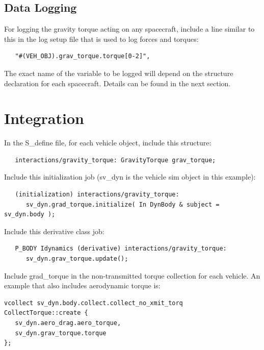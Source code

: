 \subsection{Data Logging}
For logging the gravity torque acting on any spacecraft, include a line similar to this in the log 
setup file that is used to log forces and torques:
\begin{verbatim}
   "#(VEH_OBJ).grav_torque.torque[0-2]",
\end{verbatim}
The exact name of the variable to be logged will depend on the structure
declaration for each spacecraft.  Details can be found in the next section.

\section{Integration}

In the S\_define file, for each vehicle object, include this structure:
\begin{verbatim}
   interactions/gravity_torque: GravityTorque grav_torque;
\end{verbatim}

Include this initialization job (sv\_dyn is the vehicle sim object in this example):
\begin{verbatim}
   (initialization) interactions/gravity_torque:
      sv_dyn.grad_torque.initialize( In DynBody & subject = sv_dyn.body );
\end{verbatim}

Include this derivative class job:
\begin{verbatim}
   P_BODY Idynamics (derivative) interactions/gravity_torque:
      sv_dyn.grav_torque.update();
\end{verbatim}

Include grad\_torque in the non-transmitted torque collection for each vehicle. An example
that also includes aerodynamic torque is:
\begin{verbatim}
vcollect sv_dyn.body.collect.collect_no_xmit_torq CollectTorque::create {
   sv_dyn.aero_drag.aero_torque,
   sv_dyn.grav_torque.torque
};
\end{verbatim}

